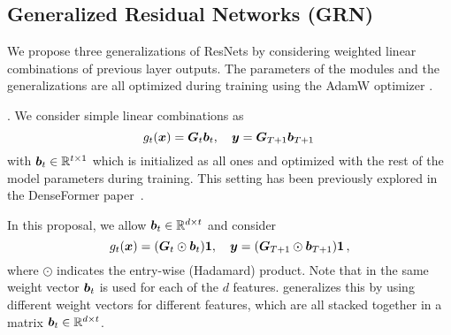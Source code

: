 \subsection{Generalized Residual Networks (GRN)}
\label{sec:grn}

We propose three generalizations of ResNets by considering weighted linear combinations of previous layer outputs. The parameters of the modules and the generalizations are all optimized during training using the AdamW optimizer \cite{loshchilov2017decoupled}.

.  We consider  simple linear combinations as 
\[
g_t(\bm{x}) = {\bm{G}}_t\bm{b}_t,\quad \bm{y} = {\bm{G}}_{T+1}\bm{b}_{T+1}\,
\]
with $\bm{b}_t\in\mathbb{R}^{t\times 1}$ which is initialized as all ones and optimized with the rest of the model parameters during training. 
This setting has been previously explored in the
DenseFormer paper~\cite{pagliardini2024denseformer}.




 In this proposal, we allow $\bm{b}_t\in \mathbb{R}^{d\times t}$ and consider
\[
g_t(\bm{x}) = ({\bm{G}}_t\odot\bm{b}_t){\mathbf{1}},\quad \bm{y} = ({\bm{G}}_{T+1}\odot\bm{b}_{T+1}){\mathbf{1}}\,,
\]
where $\odot$ indicates the entry-wise (Hadamard) product. Note that in \GenA{} the same weight vector $\bm{b}_t$ is used for each of the $d$ features. \GenB{} generalizes this by using different weight vectors for different features, which are all stacked together in a matrix $\bm{b}_t\in\mathbb{R}^{d\times t}$.



